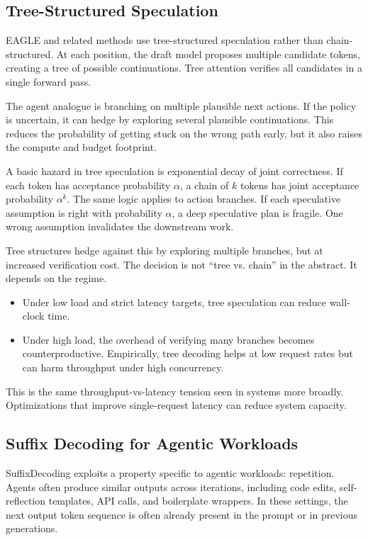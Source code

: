 \subsection{Tree-Structured Speculation}

EAGLE and related methods use tree-structured speculation rather than chain-structured. At each position, the draft model proposes multiple candidate tokens, creating a tree of possible continuations. Tree attention verifies all candidates in a single forward pass.

The agent analogue is branching on multiple plausible next actions. If the policy is uncertain, it can hedge by exploring several plausible continuations. This reduces the probability of getting stuck on the wrong path early, but it also raises the compute and budget footprint.

A basic hazard in tree speculation is exponential decay of joint correctness. If each token has acceptance probability $\alpha$, a chain of $k$ tokens has joint acceptance probability $\alpha^k$. The same logic applies to action branches. If each speculative assumption is right with probability $\alpha$, a deep speculative plan is fragile. One wrong assumption invalidates the downstream work.

Tree structures hedge against this by exploring multiple branches, but at increased verification cost. The decision is not ``tree vs. chain'' in the abstract. It depends on the regime.

\begin{itemize}
\item Under low load and strict latency targets, tree speculation can reduce wall-clock time.
\item Under high load, the overhead of verifying many branches becomes counterproductive. Empirically, tree decoding helps at low request rates but can harm throughput under high concurrency.
\end{itemize}

This is the same throughput-vs-latency tension seen in systems more broadly. Optimizations that improve single-request latency can reduce system capacity.

\subsection{Suffix Decoding for Agentic Workloads}

SuffixDecoding \cite{wang2024suffixdecoding} exploits a property specific to agentic workloads: repetition. Agents often produce similar outputs across iterations, including code edits, self-reflection templates, API calls, and boilerplate wrappers. In these settings, the next output token sequence is often already present in the prompt or in previous generations.

